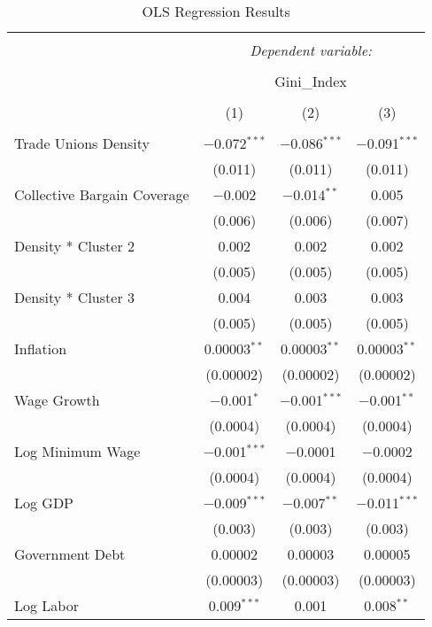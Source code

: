 
\begin{table}[!htbp] \centering 
  \caption{OLS Regression Results} 
  \label{} 
\begin{tabular}{@{\extracolsep{5pt}}lccc} 
\\[-1.8ex]\hline 
\hline \\[-1.8ex] 
 & \multicolumn{3}{c}{\textit{Dependent variable:}} \\ 
\cline{2-4} 
\\[-1.8ex] & \multicolumn{3}{c}{Gini\_Index} \\ 
\\[-1.8ex] & (1) & (2) & (3)\\ 
\hline \\[-1.8ex] 
 Trade Unions Density & $-$0.072$^{***}$ & $-$0.086$^{***}$ & $-$0.091$^{***}$ \\ 
  & (0.011) & (0.011) & (0.011) \\ 
  Collective Bargain Coverage & $-$0.002 & $-$0.014$^{**}$ & 0.005 \\ 
  & (0.006) & (0.006) & (0.007) \\ 
  Density * Cluster 2 & 0.002 & 0.002 & 0.002 \\ 
  & (0.005) & (0.005) & (0.005) \\ 
  Density * Cluster 3 & 0.004 & 0.003 & 0.003 \\ 
  & (0.005) & (0.005) & (0.005) \\ 
  Inflation & 0.00003$^{**}$ & 0.00003$^{**}$ & 0.00003$^{**}$ \\ 
  & (0.00002) & (0.00002) & (0.00002) \\ 
  Wage Growth & $-$0.001$^{*}$ & $-$0.001$^{***}$ & $-$0.001$^{**}$ \\ 
  & (0.0004) & (0.0004) & (0.0004) \\ 
  Log Minimum Wage & $-$0.001$^{***}$ & $-$0.0001 & $-$0.0002 \\ 
  & (0.0004) & (0.0004) & (0.0004) \\ 
  Log GDP & $-$0.009$^{***}$ & $-$0.007$^{**}$ & $-$0.011$^{***}$ \\ 
  & (0.003) & (0.003) & (0.003) \\ 
  Government Debt & 0.00002 & 0.00003 & 0.00005 \\ 
  & (0.00003) & (0.00003) & (0.00003) \\ 
  Log Labor & 0.009$^{***}$ & 0.001 & 0.008$^{**}$ \\ 

\end{tabular}
\end{table}

